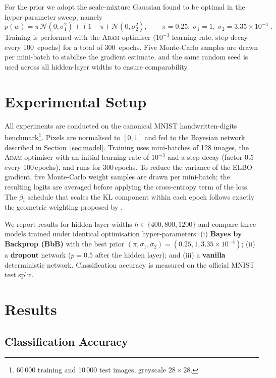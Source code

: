 \documentclass{article}
\begin{document}
For the prior we adopt the scale-mixture Gaussian found to be optimal in the hyper-parameter sweep, namely
\[
p(w)=\pi\,\mathcal{N}(0,\sigma_1^2) + (1-\pi)\,\mathcal{N}(0,\sigma_2^2),
\qquad
\pi=0.25,\;\sigma_1=1,\;\sigma_2=3.35\times10^{-4}\;.
\]
Training is performed with the \textsc{Adam} optimiser ($10^{-3}$ learning rate, step decay every 100~epochs) for a total of 300~epochs.  Five Monte-Carlo samples are drawn per mini-batch to stabilise the gradient estimate, and the same random seed is used across all hidden-layer widths to ensure comparability.

\section{Experimental Setup}

All experiments are conducted on the canonical \textsc{MNIST} handwritten-digits benchmark\footnote{60\,000 training and 10\,000 test images, greyscale $28\times28$.}.  Pixels are normalised to $[0,1]$ and fed to the Bayesian network described in Section~\ref{sec:model}.  Training uses mini-batches of 128 images, the \textsc{Adam} optimiser with an initial learning rate of $10^{-3}$ and a step decay (factor $0.5$ every 100\,epochs), and runs for 300\,epochs.  To reduce the variance of the ELBO gradient, five Monte-Carlo weight samples are drawn per mini-batch; the resulting logits are averaged before applying the cross-entropy term of the loss.  The $\beta_i$ schedule that scales the KL component within each epoch follows exactly the geometric weighting proposed by \citet{blundell2015weight}.  

We report results for hidden-layer widths $h\in\{400,800,1200\}$ and compare three models trained under identical optimisation hyper-parameters:  
(i) \textbf{Bayes by Backprop (BbB)} with the best prior $(\pi,\sigma_1,\sigma_2)=(0.25,1,3.35\times10^{-4})$;  
(ii) a \textbf{dropout} network ($p=0.5$ after the hidden layer); and  
(iii) a \textbf{vanilla} deterministic network.  Classification accuracy is measured on the official MNIST test split.

\section{Results}

\subsection{Classification Accuracy}
\end{document}
